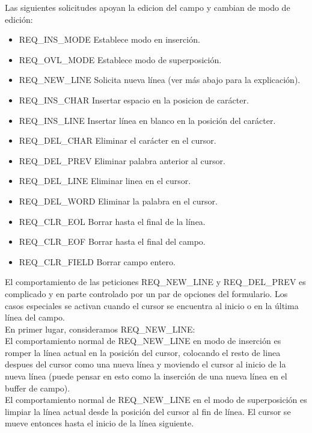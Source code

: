 \documentclass{article}
\begin{document}
Las siguientes solicitudes apoyan la edicion del campo y cambian de modo de
edición:

\begin{itemize}
  \item REQ\_INS\_MODE Establece modo en inserción.
  \item REQ\_OVL\_MODE Establece modo de superposición.
  \item REQ\_NEW\_LINE Solicita nueva línea (ver más abajo para la explicación).
  \item REQ\_INS\_CHAR Insertar espacio en la posicion de carácter.
  \item REQ\_INS\_LINE Insertar línea en blanco en la posición del carácter.
  \item REQ\_DEL\_CHAR Eliminar el carácter en el cursor.
  \item REQ\_DEL\_PREV Eliminar palabra anterior al cursor.
  \item REQ\_DEL\_LINE Eliminar linea en el cursor.
  \item REQ\_DEL\_WORD Eliminar la palabra en el cursor.
  \item REQ\_CLR\_EOL Borrar hasta el final de la línea.
  \item REQ\_CLR\_EOF Borrar hasta el final del campo.
  \item REQ\_CLR\_FIELD Borrar campo entero.
\end{itemize}

El comportamiento de las peticiones REQ\_NEW\_LINE y REQ\_DEL\_PREV es complicado y
en parte controlado por un par de opciones del formulario. Los casos especiales
se activan cuando el cursor se encuentra al inicio o en la última línea del
campo.\\

En primer lugar, consideramos REQ\_NEW\_LINE:\\

El comportamiento normal de REQ\_NEW\_LINE en modo de inserción es romper la
línea actual en la posición del cursor, colocando el resto de linea despues del
cursor como una nueva línea y moviendo el cursor al inicio de la nueva línea
(puede pensar en esto como la inserción de una nueva línea en el buffer de
campo).\\

El comportamiento normal de REQ\_NEW\_LINE en el modo de superposición es limpiar
la línea actual desde la posición del cursor al fin de línea. El cursor se
mueve entonces hasta el inicio de la línea siguiente.\\
\end{document}

